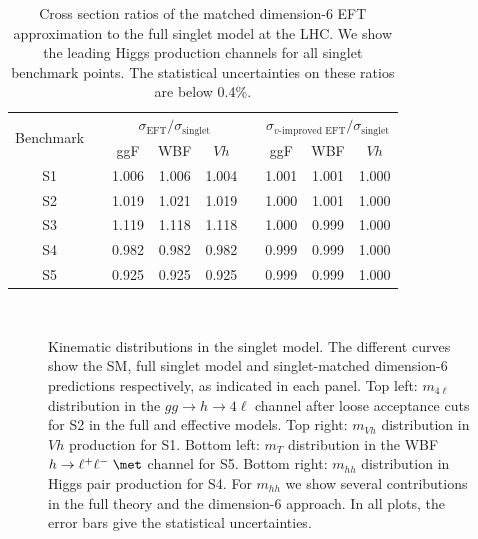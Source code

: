 \begin{table}[t] \renewcommand{\arraystretch}{1.2} \centering
  \begin{tabular}{c c ccc c ccc} \toprule \multirow{2}{*}{Benchmark}
&\hspace*{1em}& \multicolumn{3}{c}{$\sigma_\text{EFT} /
\sigma_\text{singlet}$} &\hspace*{1em}&
\multicolumn{3}{c}{$\sigma_\text{$v$-improved EFT} /
\sigma_\text{singlet}$}\\ \cmidrule{3-5} \cmidrule{7-9} && ggF & WBF &
$Vh$ && ggF & WBF & $Vh$\\ \midrule S1 && 1.006 & 1.006 & 1.004 &&
1.001 & 1.001 & 1.000 \\ S2 && 1.019 & 1.021 & 1.019 && 1.000 & 1.001
& 1.000 \\ S3 && 1.119 & 1.118 & 1.118 && 1.000 & 0.999 & 1.000 \\ S4
&& 0.982 & 0.982 & 0.982 && 0.999 & 0.999 & 1.000 \\ S5 && 0.925 &
0.925 & 0.925 && 0.999 & 0.999 & 1.000 \\ \bottomrule
  \end{tabular}
  \caption{Cross section ratios of the matched dimension-6 EFT
approximation to the full singlet model at the LHC. We show the
leading Higgs production channels for all singlet benchmark
points. The statistical uncertainties on these ratios are below
0.4\%.}
  \label{tab:singlet_rates}
\end{table}

\begin{figure}[t]
  \centering
   \\
  \caption{Kinematic distributions in the singlet model.  The
different curves show the SM, full singlet model and singlet-matched
dimension-6 predictions respectively, as indicated in each panel.  Top
left: $m_{4\ell}$ distribution in the $gg \to h \to 4 \ell$ channel
after loose acceptance cuts for S2 in the full and effective
models. Top right: $m_{Vh}$ distribution in $Vh$ production for S1.
Bottom left: $m_T$ distribution in the WBF $h \to \ell^+ \ell^- \;
\met$ channel for S5. Bottom right: $m_{hh}$ distribution in Higgs
pair production for S4. For $m_{hh}$ we show several contributions in
the full theory and the dimension-6 approach. In all plots, the error
bars give the statistical uncertainties.}
  \label{fig:validity_singlet}
\end{figure}

